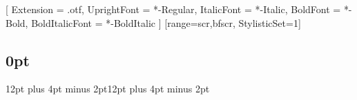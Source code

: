 \usepackage[none]{hyphenat}

\usepackage{xcolor}

  
    \usepackage{amsmath}
    \usepackage{fontspec}
    \setmainfont{STIXTwoText}[ 
    Extension = {.otf}, 
    UprightFont = {*-Regular}, 
    ItalicFont = {*-Italic}, 
    BoldFont = {*-Bold}, 
    BoldItalicFont = {*-BoldItalic}
    ]
    [range={scr,bfscr}, StylisticSet=1]
    \usepackage{bm} 
 
    \usepackage[sfdefault]{sourcesanspro}


\usepackage{caption}
\captionsetup[figure]{width=0.8\linewidth}
\captionsetup[table]{width=0.8\linewidth}
\usepackage[labelfont={color=graycaption,bf}]{caption}
\usepackage[font={small,color=graycaption}]{caption}
\captionsetup[table]{font=sf} %
\captionsetup[figure]{font=sf} %
\usepackage{subfig}
\captionsetup[figure]{skip=0pt}

\usepackage{array}

\usepackage{varwidth}

\usepackage{wrapfig}
\usepackage{float}
\renewcommand{\topfraction}{.85}
\renewcommand{\bottomfraction}{.7}
\renewcommand{\textfraction}{.15}
\renewcommand{\floatpagefraction}{.66}
\setcounter{topnumber}{3}
\setcounter{bottomnumber}{3}
\setcounter{totalnumber}{4}

\usepackage{sectsty}
\chaptertitlefont{\Huge\bfseries\sourcesanspro\color{chap}}
\chapternumberfont{\huge\bfseries\sourcesanspro\color{chap}}
\sectionfont{\normalfont\Large\bfseries\sourcesanspro}
\subsectionfont{\normalfont\large\bfseries\sourcesanspro}
\usepackage[nobottomtitles*]{titlesec}
\titlespacing\subsection{0pt}{12pt plus 4pt minus 2pt}{12pt plus 4pt minus 2pt}

